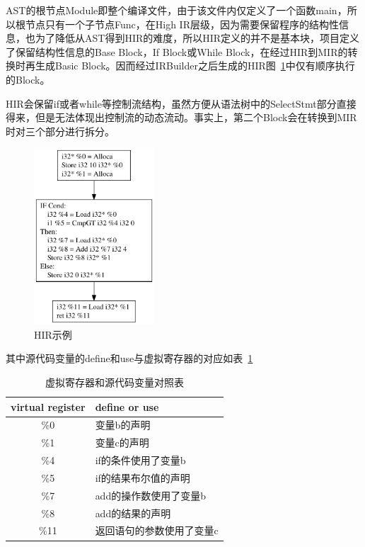 AST的根节点Module即整个编译文件，由于该文件内仅定义了一个函数main，所以根节点只有一个子节点Func，在High IR层级，因为需要保留程序的结构性信息，也为了降低从AST得到HIR的难度，所以HIR定义的并不是基本块，项目定义了保留结构性信息的Base Block，If Block或While Block，在经过HIR到MIR的转换时再生成Basic Block。因而经过IRBuilder之后生成的HIR图~\ref{fig:HIR}中仅有顺序执行的Block。

HIR会保留if或者while等控制流结构，虽然方便从语法树中的SelectStmt部分直接得来，但是无法体现出控制流的动态流动。事实上，第二个Block会在转换到MIR时对三个部分进行拆分。

\begin{figure}[htb]
  \centering
  \includegraphics[width=0.4\textwidth]{figures/HIR.pdf}
  \caption{HIR示例}
\label{fig:HIR}
\end{figure}

其中源代码变量的define和use与虚拟寄存器的对应如表~\ref{tab:compare}

\begin{table}[htb]
  \centering\small
  \caption{虚拟寄存器和源代码变量对照表}
  \label{tab:compare}
  \begin{tabular}{cl}
    \toprule
    virtual register  & define or use   \\
    \midrule
    \%0 & 变量b的声明 \\
    \%1 & 变量c的声明 \\
    \%4 & if的条件使用了变量b \\
    \%5 & if的结果布尔值的声明 \\
    \%7 & add的操作数使用了变量b \\
    \%8 & add的结果的声明 \\
    \%11 & 返回语句的参数使用了变量c \\
\bottomrule
  \end{tabular}
\end{table}

